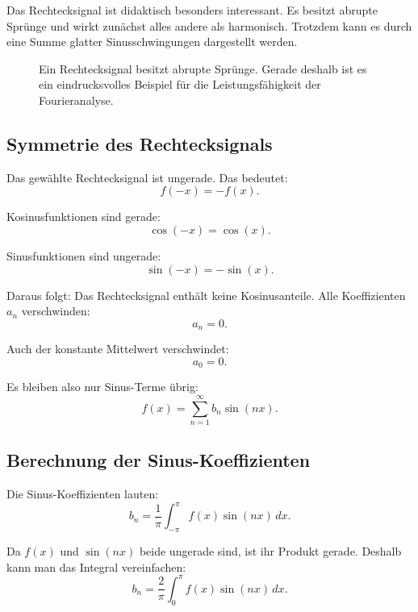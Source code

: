 Das Rechtecksignal ist didaktisch besonders interessant.
Es besitzt abrupte Sprünge und wirkt zunächst alles andere als harmonisch.
Trotzdem kann es durch eine Summe glatter Sinusschwingungen dargestellt werden.
\FloatBarrier
\begin{figure}[H]
	\centering
	\caption{Ein Rechtecksignal besitzt abrupte Sprünge.
		Gerade deshalb ist es ein eindrucksvolles Beispiel für die Leistungsfähigkeit der Fourieranalyse.}
	\label{fig:rechtecksignal}
\end{figure}

\subsection{Symmetrie des Rechtecksignals}

Das gewählte Rechtecksignal ist ungerade.
Das bedeutet:
\[
f(-x)=-f(x).
\]

Kosinusfunktionen sind gerade:
\[
\cos(-x)=\cos(x).
\]

Sinusfunktionen sind ungerade:
\[
\sin(-x)=-\sin(x).
\]

Daraus folgt:
Das Rechtecksignal enthält keine Kosinusanteile.
Alle Koeffizienten \(a_n\) verschwinden:
\[
a_n=0.
\]

Auch der konstante Mittelwert verschwindet:
\[
a_0=0.
\]

Es bleiben also nur Sinus-Terme übrig:
\[
f(x)=\sum_{n=1}^{\infty} b_n\sin(nx).
\]

\subsection{Berechnung der Sinus-Koeffizienten}

Die Sinus-Koeffizienten lauten:
\[
b_n=\frac{1}{\pi}\int_{-\pi}^{\pi}f(x)\sin(nx)\,dx.
\]

Da \(f(x)\) und \(\sin(nx)\) beide ungerade sind,
ist ihr Produkt gerade.
Deshalb kann man das Integral vereinfachen:
\[
b_n=\frac{2}{\pi}\int_{0}^{\pi}f(x)\sin(nx)\,dx.
\]

